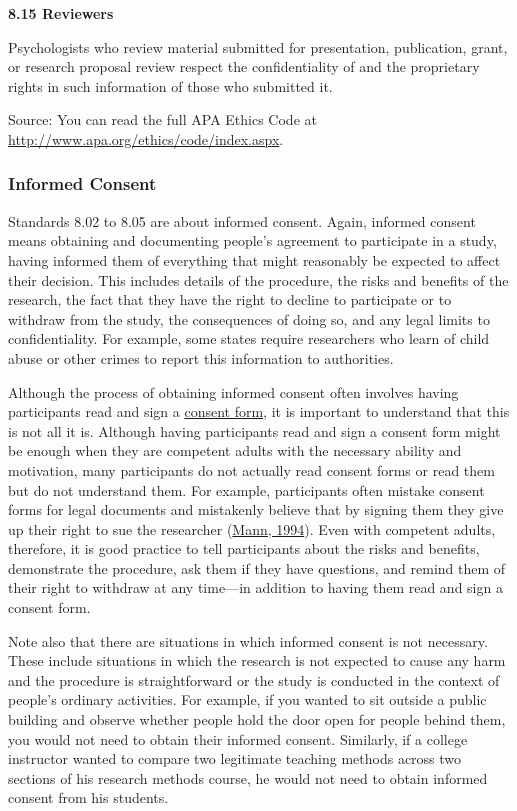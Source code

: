 \documentclass[
]{krantz}
\begin{document}
\textbf{8.15 Reviewers}

Psychologists who review material submitted for presentation, publication, grant, or research proposal review respect the confidentiality of and the proprietary rights in such information of those who submitted it.

Source: You can read the full APA Ethics Code at \url{http://www.apa.org/ethics/code/index.aspx}.

\hypertarget{informed-consent}{%
\subsubsection*{Informed Consent}\label{informed-consent}}


Standards 8.02 to 8.05 are about informed consent. Again, informed consent means obtaining and documenting people's agreement to participate in a study, having informed them of everything that might reasonably be expected to affect their decision. This includes details of the procedure, the risks and benefits of the research, the fact that they have the right to decline to participate or to withdraw from the study, the consequences of doing so, and any legal limits to confidentiality. For example, some states require researchers who learn of child abuse or other crimes to report this information to authorities.

Although the process of obtaining informed consent often involves having participants read and sign a \protect\hyperlink{consent-form}{consent form}, it is important to understand that this is not all it is. Although having participants read and sign a consent form might be enough when they are competent adults with the necessary ability and motivation, many participants do not actually read consent forms or read them but do not understand them. For example, participants often mistake consent forms for legal documents and mistakenly believe that by signing them they give up their right to sue the researcher (\protect\hyperlink{ref-mann1994informed}{Mann, 1994}). Even with competent adults, therefore, it is good practice to tell participants about the risks and benefits, demonstrate the procedure, ask them if they have questions, and remind them of their right to withdraw at any time---in addition to having them read and sign a consent form.

Note also that there are situations in which informed consent is not necessary. These include situations in which the research is not expected to cause any harm and the procedure is straightforward or the study is conducted in the context of people's ordinary activities. For example, if you wanted to sit outside a public building and observe whether people hold the door open for people behind them, you would not need to obtain their informed consent. Similarly, if a college instructor wanted to compare two legitimate teaching methods across two sections of his research methods course, he would not need to obtain informed consent from his students.
\end{document}

